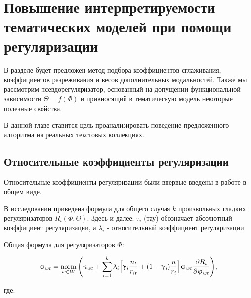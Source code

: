 \chapter{Повышение интерпретируемости тематических моделей при помощи регуляризации}

В разделе будет предложен метод подбора коэффициентов сглаживания, коэффициентов разреживания и весов дополнительных модальностей. Также мы рассмотрим псевдорегуляризатор, основанный на допущении функциональной зависимости $\Theta = f(\Phi)$ и привносящий в тематическую модель некоторые полезные свойства.

В данной главе ставится цель проанализировать поведение предложенного алгоритма на реальных текстовых коллекциях.

\section{Относительные коэффициенты регуляризации}



Относительные коэффициенты регуляризации были впервые введены в работе \cite{doykov} в общем виде.


В исследовании \cite{doykov} приведена формула для общего случая $k$ произвольных гладких регуляризаторов $R_i(\Phi, \Theta)$. Здесь и далее: $\tau_i$ (тау) обозначает абсолютный коэффициент регуляризации, а $\lambda_i$ - относительный коэффициент регуляризации

Общая формула для регуляризаторов $\Phi$:

\[
\upvarphi_{wt} = \mathop{\mathrm{norm}}\limits_{w \in W}\Bigg(
    n_{wt} + \sum_{i=1}^k \uplambda_i \Big[
        \upgamma_i \frac{n_t}{r_{it}} + (1-\upgamma_i)\frac{n}{r_i}
        \Big]
    \upvarphi_{wt} \frac{\partial R_i}{\partial \upvarphi_{wt}}
\Bigg), \label{rel_phi_general}
\]

где:

